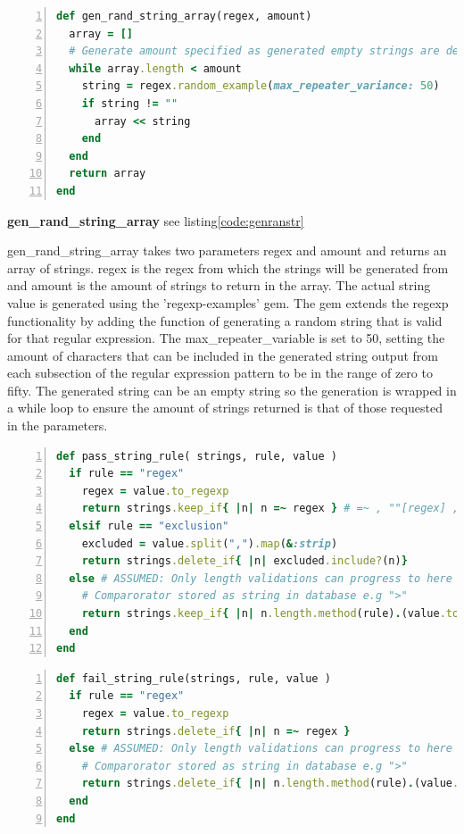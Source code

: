 \documentclass[a4paper,12pt]{article}
\begin{document}
\begin{lstlisting}[frame=single,numbers=left,language = ruby,caption= {gen\_rand\_string\_array}, label={code:genranstr}]
def gen_rand_string_array(regex, amount)
  array = []
  # Generate amount specified as generated empty strings are deleted
  while array.length < amount
    string = regex.random_example(max_repeater_variance: 50)
    if string != ""
      array << string
    end
  end
  return array
end
\end{lstlisting}

\par \textbf{gen\_rand\_string\_array} see listing\ref{code:genranstr}
\par gen\_rand\_string\_array takes two parameters regex and amount and returns an array of strings. regex is the regex from which the strings will be generated from and amount is the amount of strings to return in the array. The actual string value is generated using the 'regexp-examples'\cite{regexprangem} gem. The gem extends the regexp functionality by adding the function of generating a random string that is valid for that regular expression. The max\_repeater\_variable is set to 50, setting the amount of characters that can be included in the generated string output from each subsection of the regular expression pattern to be in the range of zero to fifty. The generated string can be an empty string so the generation is wrapped in a while loop to ensure the amount of strings returned is that of those requested in the parameters.

\begin{lstlisting}[frame=single,numbers=left,language = ruby,caption= {pass\_string\_rule}, label={code:passstrrule}]
def pass_string_rule( strings, rule, value )
  if rule == "regex"
    regex = value.to_regexp
    return strings.keep_if{ |n| n =~ regex } # =~ , ""[regex] , "".match(regex) #ATTN TIMINGS
  elsif rule == "exclusion"
    excluded = value.split(",").map(&:strip)
    return strings.delete_if{ |n| excluded.include?(n)}
  else # ASSUMED: Only length validations can progress to here
    # Comparorator stored as string in database e.g ">"
    return strings.keep_if{ |n| n.length.method(rule).(value.to_i)}
  end
end
\end{lstlisting}

\begin{lstlisting}[frame=single,numbers=left,language = ruby,caption= {fail\_string\_rule}, label={code:failstrrule}]
def fail_string_rule(strings, rule, value )
  if rule == "regex"
    regex = value.to_regexp
    return strings.delete_if{ |n| n =~ regex }
  else # ASSUMED: Only length validations can progress to here
    # Comparorator stored as string in database e.g ">"
    return strings.delete_if{ |n| n.length.method(rule).(value.to_i)}
  end
end
\end{lstlisting}
\end{document}
